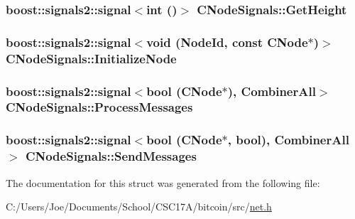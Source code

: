 \subsubsection[{Get\+Height}]{\setlength{\rightskip}{0pt plus 5cm}boost\+::signals2\+::signal$<$int ()$>$ C\+Node\+Signals\+::\+Get\+Height}\label{struct_c_node_signals_aa9f8b7c213d6c40be77242e8cbcf46e9}
\hypertarget{struct_c_node_signals_a137e1854c9fea8a56e5f30be76da8b86}{}
\subsubsection[{Initialize\+Node}]{\setlength{\rightskip}{0pt plus 5cm}boost\+::signals2\+::signal$<$void ({\bf Node\+Id}, const {\bf C\+Node}$\ast$)$>$ C\+Node\+Signals\+::\+Initialize\+Node}\label{struct_c_node_signals_a137e1854c9fea8a56e5f30be76da8b86}
\hypertarget{struct_c_node_signals_add09b68af12ffb51821a3b8b3d6a197a}{}
\subsubsection[{Process\+Messages}]{\setlength{\rightskip}{0pt plus 5cm}boost\+::signals2\+::signal$<$bool ({\bf C\+Node}$\ast$), {\bf Combiner\+All}$>$ C\+Node\+Signals\+::\+Process\+Messages}\label{struct_c_node_signals_add09b68af12ffb51821a3b8b3d6a197a}
\hypertarget{struct_c_node_signals_afff724263ba16c56bedc90cac8548cb6}{}
\subsubsection[{Send\+Messages}]{\setlength{\rightskip}{0pt plus 5cm}boost\+::signals2\+::signal$<$bool ({\bf C\+Node}$\ast$, bool), {\bf Combiner\+All}$>$ C\+Node\+Signals\+::\+Send\+Messages}\label{struct_c_node_signals_afff724263ba16c56bedc90cac8548cb6}


The documentation for this struct was generated from the following file\+:\begin{DoxyCompactItemize}
\item 
C\+:/\+Users/\+Joe/\+Documents/\+School/\+C\+S\+C17\+A/bitcoin/src/\hyperlink{net_8h}{net.\+h}\end{DoxyCompactItemize}
